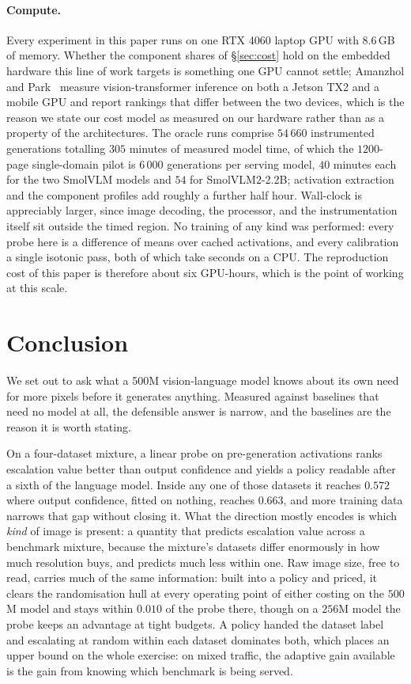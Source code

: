 \documentclass[10pt,twocolumn]{article}
\theoremstyle{plain}
\begin{document}
\paragraph{Compute.} Every experiment in this paper runs on one RTX 4060 laptop
GPU with $8.6$\,GB of memory. Whether the component shares of
\S\ref{sec:cost} hold on the embedded hardware this line of work targets is
something one GPU cannot settle; Amanzhol and Park~\cite{vitenergy} measure
vision-transformer inference on both a Jetson TX2 and a mobile GPU and report
rankings that differ between the two devices, which is the reason we state our
cost model as measured on our hardware rather than as a property of the
architectures. The oracle runs comprise $54\,660$
instrumented generations totalling $305$ minutes of measured model time, of
which the $1200$-page single-domain pilot is $6\,000$ generations per serving
model, $40$ minutes each for the two SmolVLM models and $54$ for SmolVLM2-2.2B; activation extraction and the component profiles add roughly a further
half hour. Wall-clock is appreciably larger, since image decoding, the
processor, and the instrumentation itself sit outside the timed region. No
training of any kind was performed: every probe here is a difference of means
over cached activations, and every calibration a single isotonic pass, both of
which take seconds on a CPU. The reproduction cost of this paper is therefore
about six GPU-hours, which is the point of working at this scale.

\section{Conclusion}

We set out to ask what a 500M vision-language model knows about its own need
for more pixels before it generates anything. Measured against baselines that
need no model at all, the defensible answer is narrow, and the baselines are
the reason it is worth stating.

On a four-dataset mixture, a linear probe on pre-generation activations ranks
escalation value better than output confidence and yields a policy readable
after a sixth of the language model. Inside any one of those datasets it reaches
$0.572$ where output confidence, fitted on nothing, reaches $0.663$, and more
training data narrows that gap without closing it. What the direction mostly
encodes is which \emph{kind} of image is present: a quantity that predicts
escalation value across a benchmark mixture, because the mixture's datasets
differ enormously in how much resolution buys, and predicts much less within
one. Raw image size, free to read, carries much of the same information: built
into a policy and priced, it clears the randomisation hull at every operating
point of either costing on the $500$M model and stays within $0.010$ of the
probe there, though on a $256$M model the probe keeps an advantage at tight
budgets. A policy handed the dataset label and escalating at random within each
dataset dominates both, which places an upper bound on the whole exercise:
on mixed traffic, the adaptive gain available is the gain from knowing which
benchmark is being served.
\end{document}
